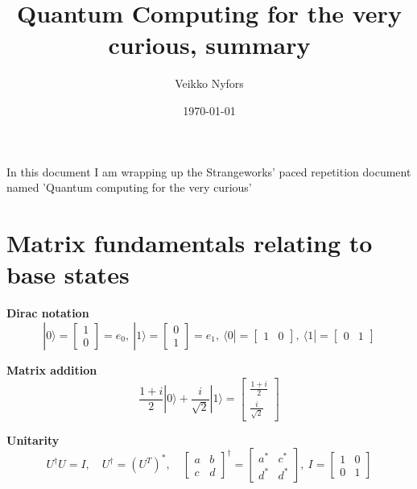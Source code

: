 \documentclass[12pt, fleqn]{article}
\title{Quantum Computing for the very curious, summary}
\author{Veikko Nyfors}
\date{\today}
\begin{document}
\maketitle

In this document I am wrapping up the Strangeworks' paced repetition document named 'Quantum computing for the very curious'
\newpage

\section{Matrix fundamentals relating to base states}

\bf{Dirac notation}
\[|0\rangle=\begin{bmatrix} 1\\0\end{bmatrix}=e_0,\:
|1\rangle=\begin{bmatrix} 0\\1\end{bmatrix}=e_1,\:
\langle0|=\begin{bmatrix} 1&0\end{bmatrix},\:\langle1|=\begin{bmatrix} 0&1\end{bmatrix}\]

\bf{Matrix addition}
\[\frac{1+i}{2}|0\rangle + \frac{i}{\sqrt{2}}|1\rangle = \begin{bmatrix} \frac{1+i}{2}\\\frac{i}{\sqrt{2}} \end{bmatrix}\]

\bf{Unitarity}
\[U^\dagger U=I,\quad U^\dagger=(U^T)^*,\quad
\begin{bmatrix}a & b\\c & d\end{bmatrix}^\dagger=\begin{bmatrix}a^* & c^*\\d^* & d^*\end{bmatrix},\:I=\begin{bmatrix}1&0\\0&1\end{bmatrix}\]
\end{document}
